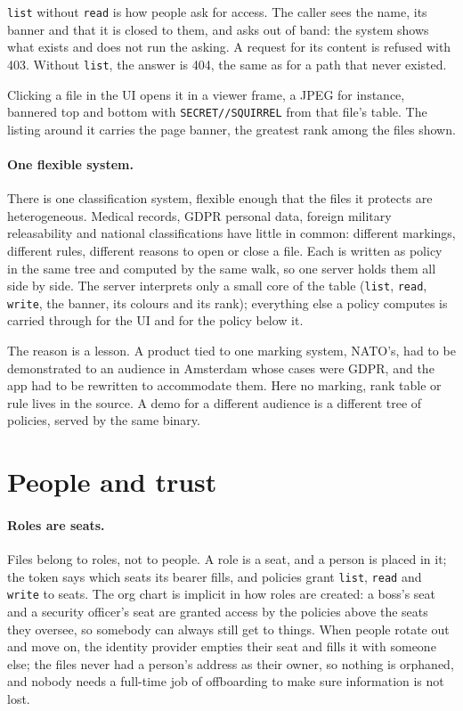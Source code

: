 \documentclass[11pt,oneside]{book}
\begin{document}
\texttt{list} without \texttt{read} is how people ask for access. The caller sees
the name, its banner and that it is closed to them, and asks out of band: the
system shows what exists and does not run the asking. A request for its content
is refused with 403. Without \texttt{list}, the answer is 404, the
same as for a path that never existed.

Clicking a file in the UI opens it in a viewer frame, a JPEG for instance,
bannered top and bottom with \texttt{SECRET//SQUIRREL} from that file's table.
The listing around it carries the page banner, the greatest rank among the files
shown.

\paragraph{One flexible system.} There is one classification system, flexible
enough that the files it protects are heterogeneous. Medical records, GDPR
personal data, foreign military releasability and national classifications have
little in common: different markings, different rules, different reasons to open
or close a file. Each is written as policy in the same tree and computed by the
same walk, so one server holds them all side by side. The server interprets only
a small core of the table (\texttt{list}, \texttt{read}, \texttt{write}, the
banner, its colours and its rank); everything else a policy computes is carried
through for the UI and for the policy below it.

The reason is a lesson. A product tied to one marking system, NATO's, had to be
demonstrated to an audience in Amsterdam whose cases were GDPR, and the app had
to be rewritten to accommodate them. Here no marking, rank table or rule lives in
the source. A demo for a different audience is a different tree of policies,
served by the same binary.

\section{People and trust}
\paragraph{Roles are seats.} Files belong to roles, not to people. A role is a
seat, and a person is placed in it; the token says which seats its bearer fills,
and policies grant \texttt{list}, \texttt{read} and \texttt{write} to seats. The
org chart is implicit in how roles are created: a boss's seat and a security
officer's seat are granted access by the policies above the seats they oversee,
so somebody can always still get to things. When people rotate out and move on,
the identity provider empties their seat and fills it with someone else; the
files never had a person's address as their owner, so nothing is orphaned, and
nobody needs a full-time job of offboarding to make sure information is not lost.
\end{document}
